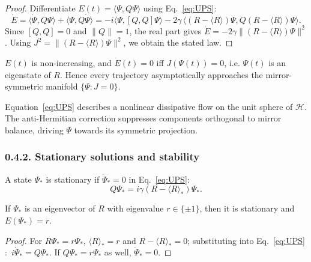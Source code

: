 \begin{proof}
Differentiate $E(t)=\langle\Psi,Q\Psi\rangle$ using Eq.~\eqref{eq:UPS}:
\[
\dot E = \langle\dot\Psi,Q\Psi\rangle+\langle\Psi,Q\dot\Psi\rangle
 = -i\langle\Psi,[Q,Q]\Psi\rangle -2\gamma\,\langle (R-\langle R\rangle)\Psi, Q(R-\langle R\rangle)\Psi\rangle.
\]
Since $[Q,Q]=0$ and $\|Q\|=1$, the real part gives
$\dot E=-2\gamma\|(R-\langle R\rangle)\Psi\|^2$.
Using $J^2=\|(R-\langle R\rangle)\Psi\|^2$, we obtain the stated law.
\end{proof}

\begin{corollary}
$E(t)$ is non-increasing, and $\dot E(t)=0$ iff $J(\Psi(t))=0$, i.e. $\Psi(t)$ is an eigenstate of $R$.
Hence every trajectory asymptotically approaches the mirror-symmetric manifold $\{\Psi:J=0\}$.
\end{corollary}

\begin{remark}
Equation~\eqref{eq:UPS} describes a nonlinear dissipative flow on the unit sphere of $\mathcal{H}$.
The anti-Hermitian correction suppresses components orthogonal to mirror balance, driving $\Psi$ towards its symmetric projection.
\end{remark}

\subsubsection*{0.4.2. Stationary solutions and stability}

\begin{definition}
A state $\Psi_*$ is stationary if $\dot\Psi_*=0$ in Eq.~\eqref{eq:UPS}$:$ 
\[
Q\Psi_* = i\gamma(R-\langle R\rangle_*)\Psi_*.
\]
\]
\end{definition}

\begin{lemma}
If $\Psi_*$ is an eigenvector of $R$ with eigenvalue $r\in\{\pm1\}$, then it is stationary and $E(\Psi_*)=r$.
\end{lemma}

\begin{proof}
For $R\Psi_*=r\Psi_*$, $\langle R\rangle_*=r$ and $R-\langle R\rangle_*=0$; substituting into Eq.~\eqref{eq:UPS}$:$ $i\dot\Psi_*=Q\Psi_*$. If $Q\Psi_*=r\Psi_*$ as well, $\dot\Psi_*=0$.
\end{proof}


